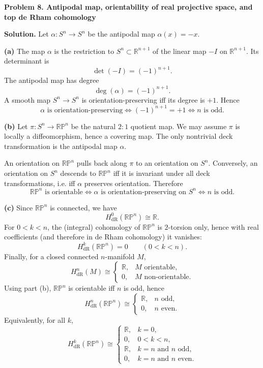 \begin{solution}
		\textbf{Problem 8. Antipodal map, orientability of real projective space, and top de Rham cohomology}
	
	\textbf{Solution.}
	Let $\alpha:S^n\to S^n$ be the antipodal map $\alpha(x)=-x$.
	
	\textbf{(a)} The map $\alpha$ is the restriction to $S^n\subset\mathbb{R}^{n+1}$ of the linear map $-I$ on $\mathbb{R}^{n+1}$.
	Its determinant is
	\[
	\det(-I)=(-1)^{n+1}.
	\]
	The antipodal map has degree
	\[
	\deg(\alpha)=(-1)^{n+1}.
	\]
	A smooth map $S^n\to S^n$ is orientation-preserving iff its degree is $+1$. Hence
	\[
	\alpha \text{ is orientation-preserving}
	\iff (-1)^{n+1}=+1
	\iff n \text{ is odd.}
	\]
	
	\textbf{(b)} Let $\pi:S^n\to \mathbb{RP}^n$ be the natural $2:1$ quotient map. We may assume $\pi$ is locally a diffeomorphism, hence a covering map.
	The only nontrivial deck transformation is the antipodal map $\alpha$.
	
	An orientation on $\mathbb{RP}^n$ pulls back along $\pi$ to an orientation on $S^n$.
	Conversely, an orientation on $S^n$ descends to $\mathbb{RP}^n$ iff it is invariant under all deck transformations, i.e. iff $\alpha$ preserves orientation.
	Therefore
	\[
	\mathbb{RP}^n \text{ is orientable}
	\iff \alpha \text{ is orientation-preserving on } S^n
	\iff n \text{ is odd.}
	\]
	
	\textbf{(c)} Since $\mathbb{RP}^n$ is connected, we have
	\[
	H^0_{\mathrm{dR}}(\mathbb{RP}^n)\cong \mathbb{R}.
	\]
	For $0<k<n$, the (integral) cohomology of $\mathbb{RP}^n$ is $2$-torsion only, hence with real coefficients (and therefore in de Rham cohomology) it vanishes:
	\[
	H^k_{\mathrm{dR}}(\mathbb{RP}^n)=0 \qquad (0<k<n).
	\]
	Finally, for a closed connected $n$-manifold $M$,
	\[
	H^n_{\mathrm{dR}}(M)\cong
	\begin{cases}
		\mathbb{R}, & M \text{ orientable},\\
		0, & M \text{ non-orientable}.
	\end{cases}
	\]
	Using part (b), $\mathbb{RP}^n$ is orientable iff $n$ is odd, hence
	\[
	H^n_{\mathrm{dR}}(\mathbb{RP}^n)\cong
	\begin{cases}
		\mathbb{R}, & n \text{ odd},\\
		0, & n \text{ even}.
	\end{cases}
	\]
	Equivalently, for all $k$,
	\[
	H^k_{\mathrm{dR}}(\mathbb{RP}^n)\cong
	\begin{cases}
		\mathbb{R}, & k=0,\\
		0, & 0<k<n,\\
		\mathbb{R}, & k=n \text{ and } n \text{ odd},\\
		0, & k=n \text{ and } n \text{ even}.
	\end{cases}
	\]
\end{solution}

